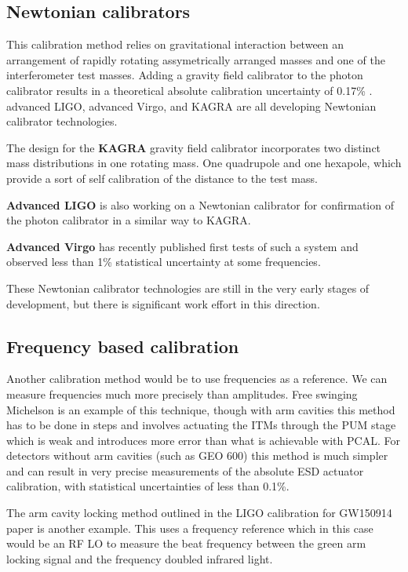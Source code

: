 \subsection{Newtonian calibrators}
This calibration method relies on gravitational interaction between an arrangement of rapidly rotating assymetrically arranged masses and one of the interferometer test masses. Adding a gravity field calibrator to the photon calibrator results in a theoretical absolute calibration uncertainty of 0.17\% .\cite{PhysRevD.98.022005}
advanced LIGO, advanced Virgo, and KAGRA are all developing Newtonian calibrator technologies.\cite{PhysRevD.98.022005,0264-9381-35-23-235009}

The design for the {\bf KAGRA} gravity field calibrator incorporates two distinct mass distributions in one rotating mass. One quadrupole and one hexapole, which provide a sort of self calibration of the distance to the test mass.\cite{PhysRevD.98.022005}\par
{\bf Advanced LIGO} is also working on a Newtonian calibrator for confirmation of the photon calibrator in a similar way to KAGRA. \par
{\bf Advanced Virgo} has recently published \cite{0264-9381-35-23-235009}  first tests of such a system and observed less than 1\% statistical uncertainty at some frequencies.\par
These Newtonian calibrator technologies are still in the very early stages of development, but there is significant work effort in this direction.

\subsection{Frequency based calibration}
Another calibration method would be to use frequencies as a reference. We can measure frequencies much more precisely than amplitudes. Free swinging Michelson is an example of this technique, though with arm cavities this method has to be done in steps and involves actuating the ITMs through the PUM stage which is weak and introduces more error than what is achievable with PCAL. For detectors without arm cavities (such as GEO 600) this method is much simpler and can result in very precise measurements of the absolute ESD actuator calibration, with statistical uncertainties of less than 0.1\%. \cite{Leong2012}

The arm cavity locking method outlined in the LIGO calibration for GW150914 paper is another example.
\cite{PhysRevD.95.062003}
This uses a frequency reference which in this case would be an RF LO to measure the beat frequency between the green arm locking signal and the frequency doubled infrared light.

